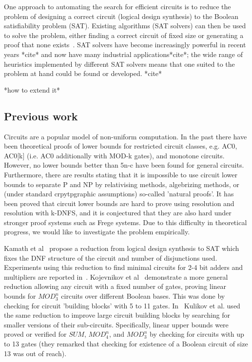 \documentclass{article}
\begin{document}
One approach to automating the search for efficient circuits is to reduce the problem of designing a correct circuit (logical design synthesis) to the Boolean satisfiability problem (SAT). Existing algorithms (SAT solvers) can then be used to solve the problem, either finding a correct circuit of fixed size or generating a proof that none exists~\cite{kulikov}. SAT solvers have become increasingly powerful in recent years *cite* and now have many industrial applications*cite*; the wide range of heuristics implemented by different SAT solvers means that one suited to the problem at hand could be found or developed. *cite* 

*how to extend it*

\subsection{Previous work}

Circuits are a popular model of non-uniform computation. In the past there have been theoretical proofs of lower bounds for restricted circuit classes, e.g. AC0\cite{furst81}\cite{ajtai83}, AC0[k] (i.e. AC0 additionally with MOD-k gates)\cite{razborov87}\cite{smolensky87}, and monotone circuits\cite{razborov85}. However, no lower bounds better than 5n-c\cite{iwama02} have been found for general circuits. Furthermore, there are results stating that it is impossible to use circuit lower bounds to separate P and NP by relativising methods\cite{baker75}, algebrizing methods\cite{aaronson09}, or (under standard crpytpgraphic assumptions) so-called 'natural proofs'\cite{razborov94}. It has been proved that circuit lower bounds are hard to prove using resolution and resolution with k-DNFS, and it is conjectured that they are also hard under stronger proof systems such as Frege systems\cite{raz}. Due to this difficulty in theoretical progress, we would like to investigate the problem empirically.

Kamath et al~\cite{kamath} propose a reduction from logical design synthesis to SAT which fixes the DNF structure of the circuit and number of disjunctions used. Experiments using this reduction to find minimal circuits for 2-4 bit adders and multipliers are reported in~\cite{estrada}. Kojevnikov et al~\cite{kulikov} demonstrate a more general reduction allowing any circuit with a fixed number of gates, proving linear bounds for \(MOD^n_3\) circuits over different Boolean bases. This was done by checking for circuit 'building blocks' with 5 to 11 gates. In~\cite{kulikovlocal} Kulikov et al. used the same reduction to improve large circuit building blocks by searching for smaller versions of their sub-circuits. Specifically, linear upper bounds were proved or verified for \(SUM\), \(MOD^n_4\), and \(MOD^n_3\) by checking for circuits with up to 13 gates (they remarked that checking for existence of a Boolean circuit of size 13 was out of reach).
\end{document}
